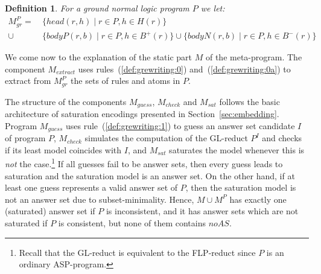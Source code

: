 \documentclass[11pt,fleqn,twoside]{article}
\newcommand{\Program}{\ensuremath{P}}
\newtheorem{definition}{Definition}
\begin{document}
			\begin{definition}
				\label{def:gProgramEncoding}
				For a ground normal logic program $\Program$ we let:
				\begin{align*}
					M^P_{\mathit{gr}} =& \ \{ \mathit{head}(r,h) \mid r \in P, h \in H(r) \} \\
						\cup & \ \{ \mathit{bodyP}(r,b) \mid r \in P, h \in B^{+}(r) \} \cup \{ \mathit{bodyN}(r,b) \mid r \in P, h \in B^{-}(r) \}
				\end{align*}
			\end{definition}

			We come now to the explanation of the static part $M$ of the meta-program.
			The component $M_{\mathit{extract}}$ uses rules~(\ref{def:grewriting:0}) and~(\ref{def:grewriting:0a}) to extract from $M^P_{\mathit{gr}}$ the sets of rules and atoms in $\Program$.
			
			The structure of the components $M_{\mathit{guess}}$, $M_{\mathit{check}}$ and $M_{\mathit{sat}}$ follows
			the basic architecture of saturation encodings presented in Section~\ref{sec:embedding}.
			Program $M_{\mathit{guess}}$ uses rule~(\ref{def:grewriting:1}) to guess an answer set candidate $I$ of program $\Program$,
			$M_{\mathit{check}}$ simulates the computation of the GL-reduct $P^I$ and checks
			if its least model coincides with $I$, and $M_{\mathit{sat}}$ saturates the model whenever this is \emph{not} the
			case.\footnote{Recall that the GL-reduct is equivalent to the FLP-reduct since $P$ is an ordinary ASP-program.}
			If all guesses fail to be answer sets, then every guess leads to saturation and the saturation model is an answer set.
			On the other hand, if at least one guess represents a valid answer set of $\Program$,
			then the saturation model is not an answer set due to subset-minimality.
			Hence, $M \cup M^P$ has exactly one (saturated) answer set if $\Program$ is inconsistent,
			and it has answer sets which are not saturated if $\Program$ is consistent, but none of them contains $\mathit{noAS}$.
\end{document}
